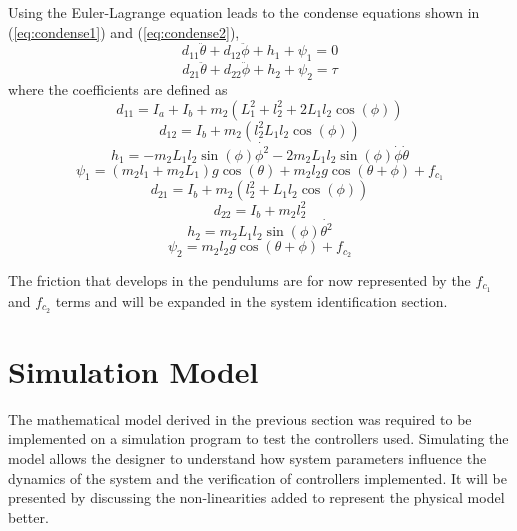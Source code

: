 Using the Euler-Lagrange equation leads to the condense equations shown in (\ref{eq:condense1}) and (\ref{eq:condense2}),
\begin{equation} \label{eq:condense1}
d_{11}\ddot{\theta}+d_{12}\ddot{\phi} + h_{1} + \psi_{1} = 0
\end{equation}
\begin{equation} \label{eq:condense2}
d_{21}\ddot{\theta} + d_{22}\ddot{\phi} + h_{2} + \psi_{2} = \tau
\end{equation}
where the coefficients are defined as
\begin{equation} \label{eq:d11}
d_{11} = I_{a} + I_{b} + m_{2}(L_{1}^2 + l_{2}^2+2L_{1}l_{2}\cos(\phi))
\end{equation}
\begin{equation} \label{eq:d12}
d_{12} = I_{b} +m_{2}(l_{2}^2 L_{1}l_{2}\cos(\phi))
\end{equation}
\begin{equation} \label{eq:h1}
h_{1} = -m_{2}L_{1}l_{2}\sin(\phi)\dot{\phi^2}-2m_{2}L_{1}l_{2}\sin(\phi)\dot{\phi}\dot{\theta}
\end{equation}
\begin{equation} \label{eq:psi1}
\psi_{1} = (m_{2}l_{1}+m_{2}L_{1})g\cos(\theta) + m_{2}l_{2}g\cos(\theta+\phi) + f_{c_{1}}
\end{equation}
\begin{equation} \label{eq:d21}
d_{21}= I_{b}+m_{2}(l_{2}^2+L_{1}l_{2}\cos(\phi))
\end{equation}
\begin{equation} \label{eq:d22}
d_{22}= I_{b}+ m_{2}l_{2}^2
\end{equation}
\begin{equation} \label{eq:h2}
h_{2}= m_{2}L_{1}l_{2}\sin(\phi)\dot{\theta^2}
\end{equation}
\begin{equation} \label{eq:psi2}
\psi_{2}= m_{2}l_{2}g\cos(\theta+\phi) + f_{c_{2}}
\end{equation}

The friction that develops in the pendulums are for now represented by the $f_{c_{1}}$ and $f_{c_{2}}$ terms and will be expanded in the system identification section.

\section{Simulation Model}
The mathematical model derived in the previous section was required to be implemented on a simulation program to test the controllers used. Simulating the model allows the designer to understand how system parameters influence the dynamics of the system and the verification of controllers implemented. It will be presented by discussing the non-linearities added to represent the physical model better.\\

